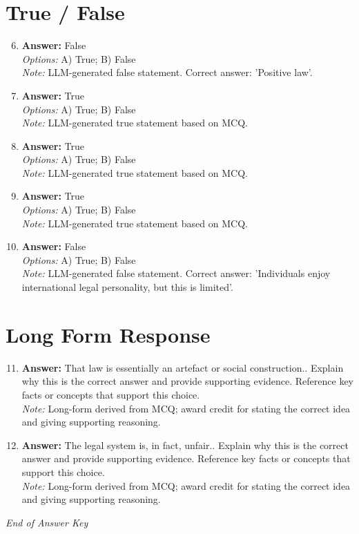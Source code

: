 \documentclass[12pt]{article}
\begin{document}
\section*{True / False}
\begin{enumerate}[label=\arabic*.]
\setcounter{enumi}{5}
\item \textbf{Answer:} False
\\ \textit{Options:} A) True; B) False
\\ \textit{Note:} LLM-generated false statement. Correct answer: 'Positive law'.
\item \textbf{Answer:} True
\\ \textit{Options:} A) True; B) False
\\ \textit{Note:} LLM-generated true statement based on MCQ.
\item \textbf{Answer:} True
\\ \textit{Options:} A) True; B) False
\\ \textit{Note:} LLM-generated true statement based on MCQ.
\item \textbf{Answer:} True
\\ \textit{Options:} A) True; B) False
\\ \textit{Note:} LLM-generated true statement based on MCQ.
\item \textbf{Answer:} False
\\ \textit{Options:} A) True; B) False
\\ \textit{Note:} LLM-generated false statement. Correct answer: 'Individuals enjoy international legal personality, but this is limited'.
\end{enumerate}

\section*{Long Form Response}
\begin{enumerate}[label=\arabic*.]
\setcounter{enumi}{10}
\item \textbf{Answer:} That law is essentially an artefact or social construction.. Explain why this is the correct answer and provide supporting evidence. Reference key facts or concepts that support this choice.
\\ \textit{Note:} Long-form derived from MCQ; award credit for stating the correct idea and giving supporting reasoning.
\item \textbf{Answer:} The legal system is, in fact, unfair.. Explain why this is the correct answer and provide supporting evidence. Reference key facts or concepts that support this choice.
\\ \textit{Note:} Long-form derived from MCQ; award credit for stating the correct idea and giving supporting reasoning.
\end{enumerate}

\vfill
\noindent\textit{End of Answer Key}
\end{document}
